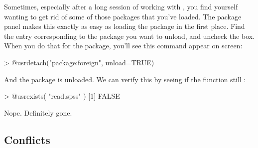 Sometimes, especially after a long session of working with \R, you find yourself wanting to get rid of some of those packages that you've loaded. The \Rstudio package panel makes this exactly as easy as loading the package in the first place. Find the entry corresponding to the package you want to unload, and uncheck the box. When you do that for the  package, you'll see this command appear on screen:
\begin{rblock1}
> @usr{detach("package:foreign", unload=TRUE)}
\end{rblock1}
And the package is unloaded. We can verify this by seeing if the  function still : 
\begin{rblock1}
> @usr{exists( "read.spss" )}
[1] FALSE 
\end{rblock1}
Nope. Definitely gone. 


\subsection{Conflicts}

